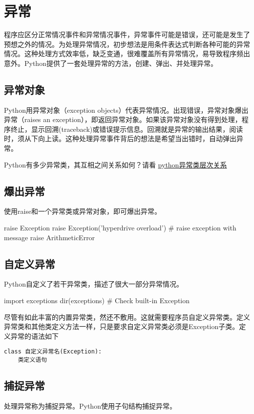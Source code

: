 \chapter{异常}
程序应区分正常情况事件和异常情况事件，异常事件可能是错误，还可能是发生了预想之外的情况。为处理异常情况，初步想法是用条件表达式判断各种可能的异常情况。这种处理方式效率低，缺乏变通，很难覆盖所有异常情况，易导致程序频出意外。Python提供了一套处理异常的方法，创建、弹出、并处理异常。

\section{异常对象}
Python用异常对象（exception objects）代表异常情况。出现错误，异常对象爆出异常（raises an exception），即返回异常对象。如果该异常对象没有得到处理，程序终止，显示回溯(traceback)或错误提示信息。回溯就是异常的输出结果，阅读时，须从下向上读。这种处理异常事件背后的想法是希望当出错时，自动弹出异常。

Python有多少异常类，其互相之间关系如何？请看
\href{https://docs.python.org/3/library/exceptions.html#exception-hierarchy}{python异常类层次关系}

\section{爆出异常}
使用raise和一个异常类或异常对象，即可爆出异常。
\begin{python}
  raise Exception
  raise Exception('hyperdrive overload')  # raise exception with message
  raise ArithmeticError
\end{python}

\section{自定义异常}
Python自定义了若干异常类，描述了很大一部分异常情况。
\begin{python}
import exceptions
dir(exceptions)  # Check built-in Exception
\end{python}
尽管有如此丰富的内置异常类，然还不敷用。这就需要程序员自定义异常类。定义异常类和其他类定义方法一样，只是要求自定义异常类必须是Exception子类。定义异常的语法如下
\begin{verbatim}
class 自定义异常名(Exception):
    类定义语句
\end{verbatim}

\section{捕捉异常}
处理异常称为捕捉异常。Python使用子句结构捕捉异常。

